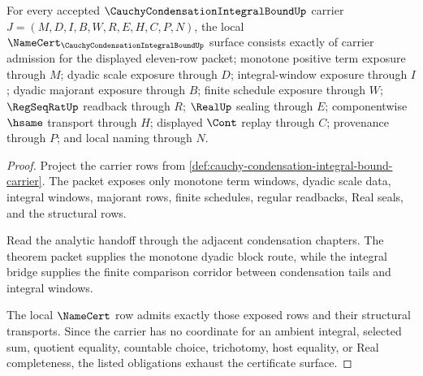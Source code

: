 \begin{theorem}
\label{thm:cauchy-condensation-integral-bound-namecert-obligations}
For every accepted $\CauchyCondensationIntegralBoundUp$ carrier $J=(M,D,I,B,W,R,E,H,C,P,N)$, the local $\NameCert_{\CauchyCondensationIntegralBoundUp}$ surface consists exactly of carrier admission for the displayed eleven-row packet; monotone positive term exposure through $M$; dyadic scale exposure through $D$; integral-window exposure through $I$; dyadic majorant exposure through $B$; finite schedule exposure through $W$; $\RegSeqRatUp$ readback through $R$; $\RealUp$ sealing through $E$; componentwise $\hsame$ transport through $H$; displayed $\Cont$ replay through $C$; provenance through $P$; and local naming through $N$.
\end{theorem}
\begin{proof}
Project the carrier rows from \autoref{def:cauchy-condensation-integral-bound-carrier}. The packet exposes only monotone term windows, dyadic scale data, integral windows, majorant rows, finite schedules, regular readbacks, Real seals, and the structural rows.

Read the analytic handoff through the adjacent condensation chapters. The theorem packet supplies the monotone dyadic block route, while the integral bridge supplies the finite comparison corridor between condensation tails and integral windows.

The local $\NameCert$ row admits exactly those exposed rows and their structural transports. Since the carrier has no coordinate for an ambient integral, selected sum, quotient equality, countable choice, trichotomy, host equality, or Real completeness, the listed obligations exhaust the certificate surface.
\end{proof}

